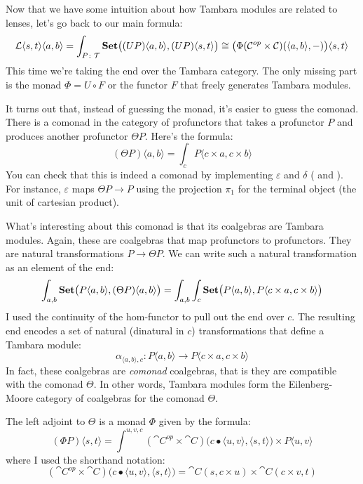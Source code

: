 \documentclass[DaoFP]{subfiles}
\begin{document}
Now that we have some intuition about how Tambara modules are related to lenses, let's go back to our main formula:
\[  \mathcal{L}\langle s, t\rangle \langle a, b \rangle =\int_{P \colon \mathcal{T}} \mathbf{Set} \big((U P) \langle a, b\rangle, (U P) \langle s, t\rangle \big) \cong \big( \Phi (\mathcal{C}^{op} \times \mathcal{C}) (\langle a, b\rangle ,-) \big) \langle s, t\rangle \]
This time we're taking the end over the Tambara category. The only missing part is the monad $\Phi = U \circ F$ or the functor $F$ that freely generates Tambara modules.

It turns out that, instead of guessing the monad, it's easier to guess the comonad. There is a comonad in the category of profunctors that takes a profunctor $P$ and produces another profunctor $\Theta P$. Here's the formula:
\[(\Theta P) \langle a, b \rangle = \int_c P \langle c \times a, c \times b \rangle \]
You can check that this is indeed a comonad by implementing $\varepsilon$ and $\delta$ ( and ). For instance, $\varepsilon$ maps $\Theta P \to P$ using the projection $\pi_1$ for the terminal object (the unit of cartesian product).

What's interesting about this comonad is that its coalgebras are Tambara modules. Again, these are coalgebras that map profunctors to profunctors. They are natural transformations $P \to \Theta P$. We can write such a natural transformation as an element of the end:
\[\int_{a, b} \mathbf{Set} \big (P \langle a, b \rangle, (\Theta P) \langle a, b \rangle \big) = \int_{a, b} \int_c \mathbf{Set} \big( P\langle a, b \rangle , P \langle c \times a, c \times b \rangle \big) \]
I used the continuity of the hom-functor to pull out the end over $c$. The resulting end encodes a set of natural (dinatural in $c$) transformations that define a Tambara module:
\[ \alpha_{\langle a, b\rangle, c} \colon P \langle a, b \rangle \to P \langle c \times a, c \times b \rangle \]
In fact, these coalgebras are \emph{comonad} coalgebras, that is they are compatible with the comonad $\Theta$. In other words, Tambara modules form the Eilenberg-Moore category of coalgebras for the comonad $\Theta$.

The left adjoint to $\Theta$ is a monad $\Phi$ given by the formula:
\[(\Phi P)  \langle s, t \rangle = \int^{u, v, c} (\cat C^{op} \times \cat C) \big(c \bullet \langle u, v\rangle , \langle s, t \rangle\big) \times P \langle u, v \rangle \]
where I used the shorthand notation:
\[ (\cat C^{op} \times \cat C) \big(c \bullet \langle u, v\rangle , \langle s, t \rangle\big) = \cat C(s, c \times u) \times \cat C(c \times v, t) \]
\end{document}
